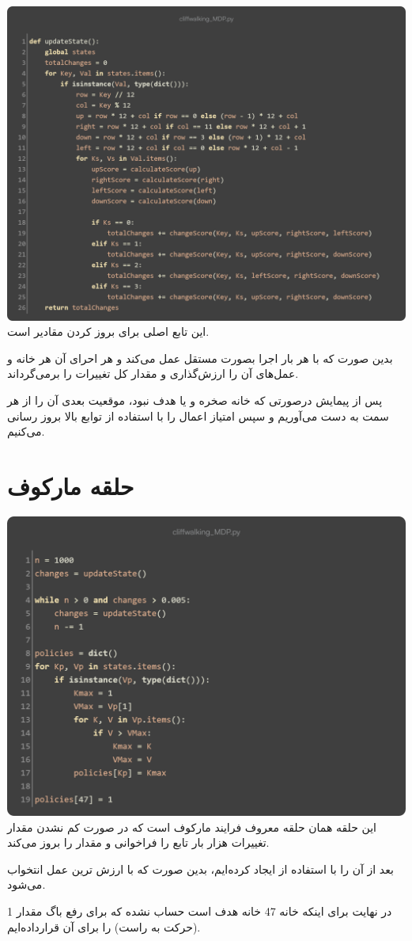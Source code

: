 \documentclass[12pt, dvipsnames, svgnames, x11names,]{article}
\begin{document}
		{\includegraphics[width=14cm]{images/05}}
		{\normalsize این تابع اصلی برای بروز کردن مقادیر  است.} \par
		{\normalsize بدین صورت که با هر بار اجرا بصورت مستقل عمل می‌کند و  هر احرای آن هر خانه و عمل‌های آن را ارزش‌گذاری و مقدار کل تغییرات را برمی‌گرداند.} \par
		{\normalsize پس از پیمایش  درصورتی که خانه صخره و یا هدف نبود، موقعیت بعدی آن را از هر سمت به دست می‌آوریم و سپس امتیاز اعمال را با استفاده از توابع بالا بروز رسانی می‌کنیم.} \par
	
		
	\section{حلقه مارکوف}
	
	{\includegraphics[width=14cm]{images/06}}
	{\normalsize این حلقه همان حلقه معروف فرایند مارکوف است که در صورت کم نشدن مقدار تغییرات هزار بار تابع  را فراخوانی و مقدار  را بروز می‌کند.} \par
	{\normalsize بعد از آن  را با استفاده از  ایجاد کرده‌ایم، بدین صورت که با ارزش ترین عمل انتخواب می‌شود.} \par
	{\normalsize در نهایت برای اینکه خانه 47 خانه هدف است حساب نشده که برای رفع باگ مقدار 1 (حرکت به راست) را برای آن قرارداده‌ایم.}
\end{document}
